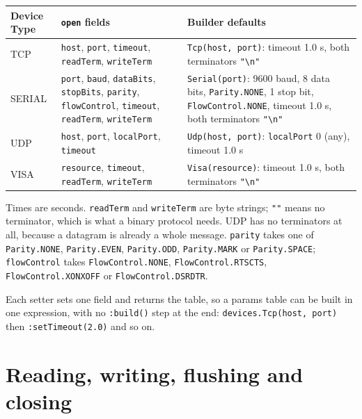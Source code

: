 \begin{center}
\footnotesize
\begin{tabular}{@{}>{\raggedright\arraybackslash}p{1.6cm}>{\raggedright\arraybackslash}p{6.8cm}>{\raggedright\arraybackslash}p{6.2cm}@{}}
\toprule
Device Type & \texttt{open} fields & Builder defaults \\
\midrule
TCP & \texttt{host}, \texttt{port}, \texttt{timeout}, \texttt{readTerm}, \texttt{writeTerm} &
  \texttt{Tcp(host, port)}: timeout 1.0 s, both terminators \texttt{"\textbackslash n"} \\
SERIAL & \texttt{port}, \texttt{baud}, \texttt{dataBits}, \texttt{stopBits}, \texttt{parity},
  \texttt{flowControl}, \texttt{timeout}, \texttt{readTerm}, \texttt{writeTerm} &
  \texttt{Serial(port)}: 9600 baud, 8 data bits, \texttt{Parity.NONE}, 1 stop bit,
  \texttt{FlowControl.NONE}, timeout 1.0 s, both terminators \texttt{"\textbackslash n"} \\
UDP & \texttt{host}, \texttt{port}, \texttt{localPort}, \texttt{timeout} &
  \texttt{Udp(host, port)}: \texttt{localPort} 0 (any), timeout 1.0 s \\
VISA & \texttt{resource}, \texttt{timeout}, \texttt{readTerm}, \texttt{writeTerm} &
  \texttt{Visa(resource)}: timeout 1.0 s, both terminators \texttt{"\textbackslash n"} \\
\bottomrule
\end{tabular}
\end{center}

Times are seconds. \texttt{readTerm} and \texttt{writeTerm} are byte strings; \texttt{""} means
no terminator, which is what a binary protocol needs. UDP has no terminators at all, because a
datagram is already a whole message. \texttt{parity} takes one of \texttt{Parity.NONE},
\texttt{Parity.EVEN}, \texttt{Parity.ODD}, \texttt{Parity.MARK} or \texttt{Parity.SPACE};
\texttt{flowControl} takes \texttt{FlowControl.NONE}, \texttt{FlowControl.RTSCTS},
\texttt{FlowControl.XONXOFF} or \texttt{FlowControl.DSRDTR}.

Each setter sets one field and returns the table, so a params table can be built in one
expression, with no \texttt{:build()} step at the end: \texttt{devices.Tcp(host, port)} then
\texttt{:setTimeout(2.0)} and so on.

\section{Reading, writing, flushing and closing}

